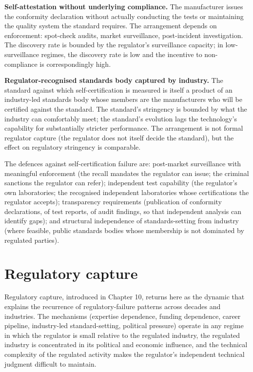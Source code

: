\textbf{Self-attestation without underlying compliance.} The manufacturer issues the conformity declaration without actually conducting the tests or maintaining the quality system the standard requires. The arrangement depends on enforcement: spot-check audits, market surveillance, post-incident investigation. The discovery rate is bounded by the regulator's surveillance capacity; in low-surveillance regimes, the discovery rate is low and the incentive to non-compliance is correspondingly high.

\textbf{Regulator-recognised standards body captured by industry.} The standard against which self-certification is measured is itself a product of an industry-led standards body whose members are the manufacturers who will be certified against the standard. The standard's stringency is bounded by what the industry can comfortably meet; the standard's evolution lags the technology's capability for substantially stricter performance. The arrangement is not formal regulator capture (the regulator does not itself decide the standard), but the effect on regulatory stringency is comparable.

The defences against self-certification failure are: post-market surveillance with meaningful enforcement (the recall mandates the regulator can issue; the criminal sanctions the regulator can refer); independent test capability (the regulator's own laboratories; the recognised independent laboratories whose certifications the regulator accepts); transparency requirements (publication of conformity declarations, of test reports, of audit findings, so that independent analysis can identify gaps); and structural independence of standards-setting from industry (where feasible, public standards bodies whose membership is not dominated by regulated parties).

\section{Regulatory capture}

Regulatory capture, introduced in Chapter 10, returns here as the dynamic that explains the recurrence of regulatory-failure patterns across decades and industries. The mechanisms (expertise dependence, funding dependence, career pipeline, industry-led standard-setting, political pressure) operate in any regime in which the regulator is small relative to the regulated industry, the regulated industry is concentrated in its political and economic influence, and the technical complexity of the regulated activity makes the regulator's independent technical judgment difficult to maintain.


